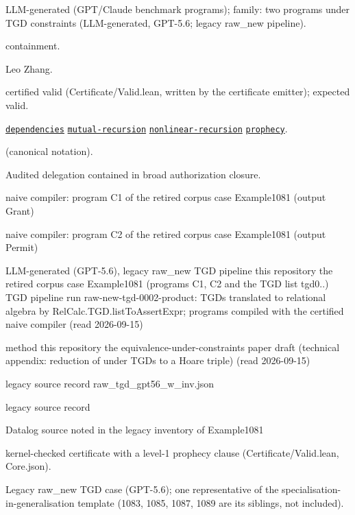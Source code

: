 \documentclass[10pt]{article}
\begin{document}
\begin{description}[leftmargin=2.6cm,style=nextline,itemsep=1pt]

\item[Category] LLM-generated (GPT/Claude benchmark programs); family: two programs under TGD constraints (LLM-generated, GPT-5.6; legacy raw\_new pipeline).

\item[Kind] containment.

\item[Contributors] Leo Zhang.

\item[Status] certified valid (Certificate/Valid.lean, written by the certificate emitter); expected valid.

\item[Tags] \hyperref[tag:dependencies]{\texttt{dependencies}} \hyperref[tag:mutual-recursion]{\texttt{mutual-recursion}} \hyperref[tag:nonlinear-recursion]{\texttt{nonlinear-recursion}} \hyperref[tag:prophecy]{\texttt{prophecy}}.

\item[Input]  (canonical notation).

\item[Summary] Audited delegation contained in broad authorization closure.

\item[Sides] naive compiler: program C1 of the retired corpus case Example1081 (output Grant) \par naive compiler: program C2 of the retired corpus case Example1081 (output Permit)

\item[Sources] {\raggedright LLM-generated (GPT-5.6), legacy raw\_new TGD pipeline this repository the retired corpus case Example1081 (programs C1, C2 and the TGD list tgd0..) TGD pipeline run raw-new-tgd-0002-product: TGDs translated to relational algebra by RelCalc.TGD.listToAssertExpr; programs compiled with the certified naive compiler (read 2026-09-15) \par method this repository the equivalence-under-constraints paper draft (technical appendix: reduction of  under TGDs to a Hoare triple) (read 2026-09-15) \par legacy source record raw\_tgd\_gpt56\_w\_inv.json \par legacy source record  \par Datalog source noted in the legacy inventory of Example1081\par}

\item[Prophecy] kernel-checked certificate with a level-1 prophecy clause (Certificate/Valid.lean, Core.json).

\item[Note] Legacy raw\_new TGD case (GPT-5.6); one representative of the specialisation-in-generalisation template (1083, 1085, 1087, 1089 are its siblings, not included).

\end{description}
\end{document}

